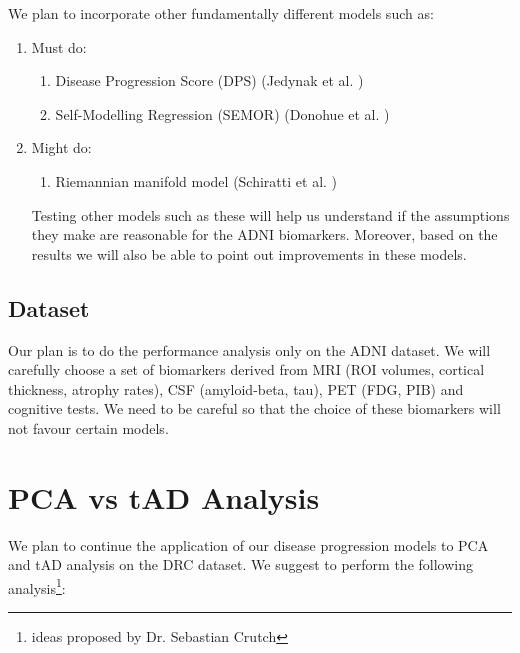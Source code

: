 We plan to incorporate other fundamentally different models such as:
\begin{enumerate}
 \item Must do:
 \begin{enumerate}
 \item Disease Progression Score (DPS) (Jedynak et al. \cite{jedynak2012computational})
 \item Self-Modelling Regression (SEMOR) (Donohue et al. \cite{donohue2014estimating})
 \end{enumerate}
 \item Might do:
 \begin{enumerate}
 \item Riemannian manifold model (Schiratti et al. \cite{schiratti2015learning})
 \end{enumerate}
Testing other models such as these will help us understand if the assumptions they make are reasonable for the ADNI biomarkers. Moreover, based on the results we will also be able to point out improvements in these models. 
 
 
\end{enumerate}


\subsection{Dataset}
\label{sec:plan_dataset}

Our plan is to do the performance analysis only on the ADNI dataset. We will carefully choose a set of biomarkers derived from MRI (ROI volumes, cortical thickness, atrophy rates), CSF (amyloid-beta, tau), PET (FDG, PIB) and cognitive tests. We need to be careful so that the choice of these biomarkers will not favour certain models. 

\section{PCA vs tAD Analysis}
\label{sec:plan_pca_paper_seb}

We plan to continue the application of our disease progression models to PCA and tAD analysis on the DRC dataset. We suggest to perform the following analysis\footnote{ideas proposed by Dr. Sebastian Crutch}:

